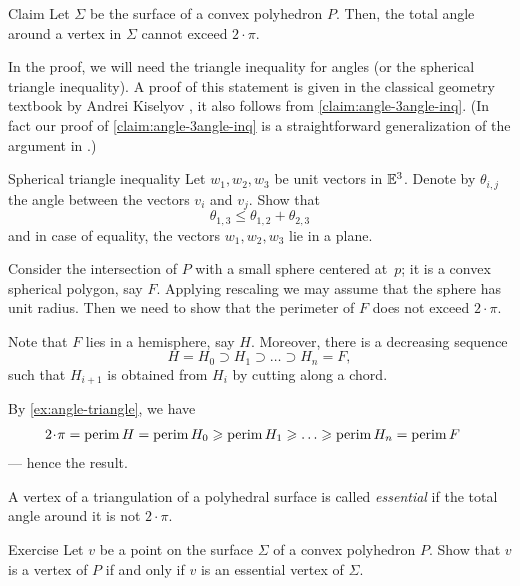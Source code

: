 \begin{thm}{Claim}\label{clm:total-angle}
Let $\Sigma$ be the surface of a convex polyhedron $P$.
Then, the total angle around a vertex in $\Sigma$ cannot exceed $2\cdot\pi$.
\end{thm} 


In the proof, we will need the triangle inequality for angles (or the spherical triangle inequality).
A proof of this statement is given in the classical geometry textbook by Andrei Kiselyov \cite[§ 47]{kiselev-stereo-en},
it also follows from \ref{claim:angle-3angle-inq}.
(In fact our proof of \ref{claim:angle-3angle-inq} is a straightforward generalization of the argument in \cite[§ 47]{kiselev-stereo-en}.)

\begin{thm}{Spherical triangle inequality}\label{ex:angle-triangle}
Let $w_1,w_2,w_3$ be unit vectors in $\mathbb{E}^3$.
Denote by $\theta_{i,j}$ the angle between the vectors $v_i$ and $v_j$.
Show that
$$\theta_{1,3}\le \theta_{1,2}+\theta_{2,3}$$
and in case of equality, the vectors $w_1,w_2,w_3$ lie in a plane.
\end{thm}

Consider the intersection of $P$ with a small sphere centered at~$p$;
it is a convex spherical polygon, say $F$.
Applying rescaling we may assume that the sphere has unit radius.
Then we need to show that the perimeter of $F$ does not exceed $2\cdot\pi$.

Note that $F$ lies in a hemisphere, say $H$.
Moreover, there is a decreasing sequence 
\[H=H_0\supset H_1\supset\dots\supset H_n=F,\]
such that $H_{i+1}$ is obtained from $H_{i}$ by cutting along a chord.

By \ref{ex:angle-triangle}, we have
\begin{align*}
2\cdot\pi=\perim H=\perim H_0&\ge\perim H_1\ge\dots\ge\perim H_n=\perim F
\end{align*}
--- hence the result.
\qedsf

A vertex of a triangulation of a polyhedral surface is called \emph{essential} if the total angle around it is not $2\cdot\pi$.

\begin{thm}{Exercise}\label{ex:vertex-essential-vertex}
Let $v$ be a point on the surface $\Sigma$ of a convex polyhedron $P$.
Show that $v$ is a vertex of $P$ if and only if 
$v$ is an essential vertex of $\Sigma$.
\end{thm}


